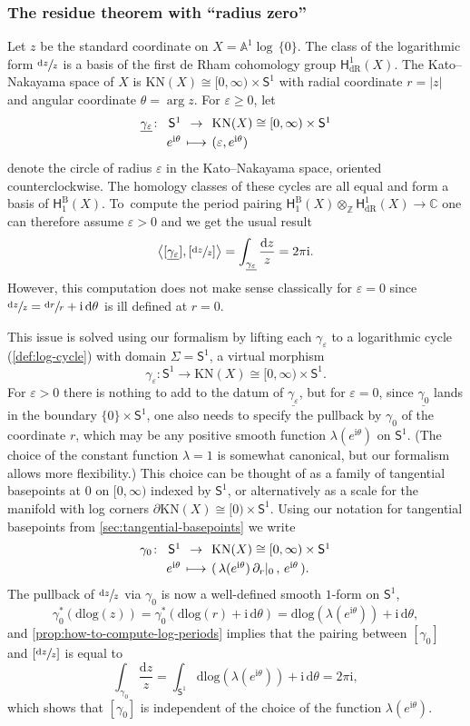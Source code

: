 \documentclass[10pt]{amsart}
\let\oldbullet\bullet
\renewcommand{\bullet}{{\raisebox{1pt}{$\scriptscriptstyle\oldbullet$}}}
\newcommand\mto{\mathchoice{\longmapsto}{\mapsto}{\mapsto}{\mapsto}}
\newcommand{\dslog}[1]{\sfrac{\dd#1}{#1}}
\newcommand{\mapdef}[5]{\arraycolsep2pt
\begin{array}{crcl}
#1 \colon & #2 &\dpl\to & #3 \\[3pt]
& #4 &\dpl\mto& #5
\end{array}
}
\theoremstyle{definition}
\theoremstyle{remark}
\newcommand{\CC}{\mathbb{C}}
\newcommand{\ZZ}{\mathbb{Z}}
\newcommand{\AF}{\mathbb{A}}
\newcommand{\halfspc}[1]{[0,\infty)^{#1}}
\newcommand{\logcyl}{\AF^1 \log\, \{0\}}
\renewcommand{\ge}{\geqslant}
\newcommand{\iu}{\mathrm{i}}
\newcommand{\ipi}{\pi\iu }
\newcommand{\tipi}{2\ipi}
\let\epsilon\varepsilon
\newcommand{\abrac}[1]{\left\langle#1\right\rangle}
\newcommand{\sbrac}[1]{\left[#1\right]}
\newcommand{\dd}{\mathrm{d}}
\newcommand{\dlog}[1]{\frac{\dd#1}{#1}}
\newcommand{\Sig}{\Sigma}
\newcommand{\KN}[1]{\mathrm{KN}(#1)}
\newcommand{\HdR}[2][\bullet]{\mathsf{H}_{\mathrm{dR}}^{#1}(#2)}
\newcommand{\HlgyB}[2][\bullet]{\mathsf{H}^{\mathrm{B}}_{#1}(#2)}
\newcommand{\unitcirc}{\mathsf{S}^{1}}
\let\dpl\displaystyle
\begin{document}
\subsubsection{The residue theorem with ``radius zero''}
Let $z$ be the standard coordinate on $X = \logcyl$. The class of the logarithmic form $\dslog{z}$ is a basis of the first de Rham cohomology group $\HdR[1]{X}$. The Kato--Nakayama space of $X$ is $\KN{X} \cong \halfspc{} \times \unitcirc$ with radial coordinate $r = |z|$ and angular coordinate $\theta = \arg z$. For $\epsilon \ge 0$, let
\[
\mapdef{\underline{\gamma_\epsilon}}{\unitcirc}{\KN{X}\cong [0,\infty)\times\unitcirc}{
e^{\iu\theta}}{(\epsilon, e^{\iu\theta})}
\]
denote the circle of radius $\epsilon$ in the Kato--Nakayama space, oriented counterclockwise. The homology classes of these cycles are all equal and form a basis of $\HlgyB[1]{X}$. To~compute the period pairing $\HlgyB[1]{X}\otimes_\ZZ \HdR[1]{X}\to\CC $ one can therefore assume $\varepsilon>0$ and we get the usual result
\[
\abrac{[\underline{\gamma_\epsilon}],\sbrac{\dslog{z}}} = \int_{\underline{\gamma_\epsilon}} \dlog{z} = \tipi.
\]
However, this computation does not make sense classically for $\epsilon=0$ since $\dslog{z}=\dslog{r}+\iu\,\dd\theta$ is ill defined at $r=0$.

This issue is solved using our formalism by lifting each $\gamma_\epsilon$ to a logarithmic cycle (\autoref{def:log-cycle}) with domain $\Sig=\unitcirc$, \ie a virtual morphism
\[
\gamma_\epsilon\colon\unitcirc\to \KN{X}\cong [0,\infty)\times\unitcirc.
\]
For $\epsilon>0$ there is nothing to add to the datum of $\underline{\gamma_\epsilon}$, but for $\varepsilon=0$, since $\underline{\gamma_0}$ lands in the boundary $\{0\}\times\unitcirc$, one also needs to specify the pullback by $\gamma_0$ of the coordinate $r$, which may be any positive smooth function $\lambda(e^{\iu\theta})$ on $\unitcirc$. (The choice of the constant function $\lambda=1$ is somewhat canonical, but our formalism allows more flexibility.) This choice can be thought of as a family of tangential basepoints at $0$ on $[0,\infty)$ indexed by $\unitcirc$, or alternatively as a scale for the manifold with log corners $\partial\KN{X}\cong [0)\times \unitcirc$. Using our notation for tangential basepoints from \autoref{sec:tangential-basepoints} we write
\[
\mapdef{\gamma_0}{\unitcirc}{\KN{X}\cong [0,\infty)\times\unitcirc}{
e^{\iu\theta}}{(\,\lambda(e^{\iu\theta})\,\partial_r|_0 \, , \, e^{\iu\theta}\, ).}
\]
The pullback of $\dslog{z}$ via $\gamma_0$ is now a well-defined smooth $1$-form on $\unitcirc$,
\[
\gamma_0^*\left(\mathrm{dlog}(z)\right)=\gamma_0^*\left(\mathrm{dlog}(r)+\iu\,\dd\theta\right)=\mathrm{dlog}(\lambda(e^{\iu\theta}))+\iu\,\dd\theta,
\]
and \autoref{prop:how-to-compute-log-periods} implies that the pairing between $[\gamma_0]$ and $[\dslog{z}]$ is equal to
\[
\int_{\gamma_0}\dlog{z} = \int_{\unitcirc}\mathrm{dlog}(\lambda(e^{\iu\theta}))+\iu\,\dd \theta =2\pi\iu,
\]
which shows that $[\gamma_0]$ is independent of the choice of the function $\lambda(e^{\iu\theta})$.
\end{document}
